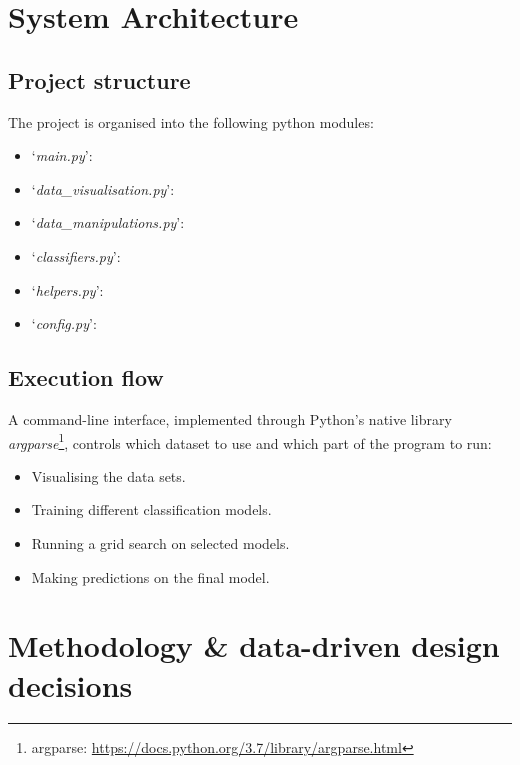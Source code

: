\documentclass[letterpaper,12pt]{article}
\begin{document}

\section{System Architecture}
\label{sec:system-architecture}

\subsection{Project structure}

The project is organised into the following python modules:
\begin{itemize}
    \item `\textit{main.py}': 
    \item `\textit{data\_visualisation.py}': 
    \item `\textit{data\_manipulations.py}': 
    \item `\textit{classifiers.py}':
    \item `\textit{helpers.py}': 
    \item `\textit{config.py}': 
\end{itemize}

\subsection{Execution flow}

A command-line interface, implemented through Python’s native library \textit{argparse}\footnote{argparse: \url{https://docs.python.org/3.7/library/argparse.html}}, controls which dataset to use and which part of the program to run:
\begin{itemize}
    \item Visualising the data sets.
    \item Training different classification models.
    \item Running a grid search on selected models.
    \item Making predictions on the final model.
\end{itemize}


\section{Methodology \& data-driven design decisions}
\label{sec:methodology-design}
\end{document}
